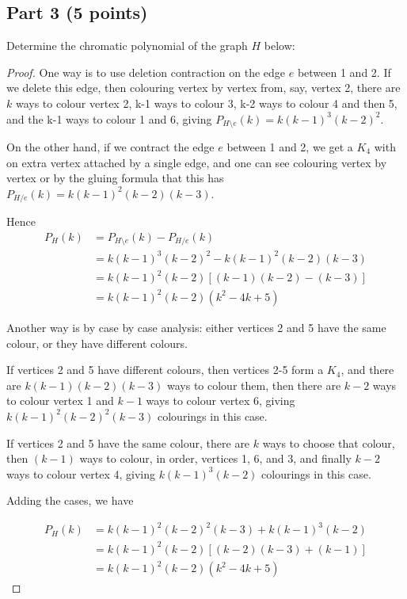 \documentclass{amsart}
\begin{document}
 \subsection*{Part 3 (5 points)}
 Determine the chromatic polynomial of the graph $H$ below:

\begin{proof}
  One way is to use deletion contraction on the edge $e$ between 1 and 2.  If we delete this edge, then colouring vertex by vertex from, say, vertex 2, there are $k$ ways to colour vertex 2, k-1 ways to colour 3, k-2 ways to colour 4 and then 5, and the k-1 ways to colour 1 and 6, giving $P_{H\setminus e}(k)=k(k-1)^3(k-2)^2$.

  On the other hand, if we contract the edge $e$ between 1 and 2, we get a $K_4$ with on extra vertex attached by a single edge, and one can see colouring vertex by vertex or by the gluing formula that this has $P_{H/e}(k)=k(k-1)^2(k-2)(k-3)$.

  Hence
  \begin{align*} P_H(k) &= P_{H\setminus e}(k)-P_{H/e}(k) \\
    &=k(k-1)^3(k-2)^2-k(k-1)^2(k-2)(k-3) \\
    &=k(k-1)^2(k-2)\left[(k-1)(k-2)-(k-3)\right] \\
    &=k(k-1)^2(k-2)(k^2-4k+5)
  \end{align*}

  Another way is by case by case analysis: either vertices 2 and 5 have the same colour, or they have different colours.

If vertices 2 and 5 have different colours, then vertices 2-5 form a $K_4$, and there are $k(k-1)(k-2)(k-3)$ ways to colour them, then there are $k-2$ ways to colour vertex 1 and $k-1$ ways to colour vertex 6, giving $k(k-1)^2(k-2)^2(k-3)$ colourings in this case.
  
  If vertices 2 and 5 have the same colour, there are $k$ ways to choose that colour, then $(k-1)$ ways to colour, in order, vertices 1, 6, and 3, and finally $k-2$ ways to colour vertex 4, giving $k(k-1)^3(k-2)$ colourings in this case.

  Adding the cases, we have

  \begin{align*} P_H(k) &=k(k-1)^2(k-2)^2(k-3) + k(k-1)^3(k-2) \\
    &=k(k-1)^2(k-2)\left[(k-2)(k-3)+(k-1)\right] \\
    &=k(k-1)^2(k-2)(k^2-4k+5)
    \end{align*}
 



  \end{proof}
\end{document}
